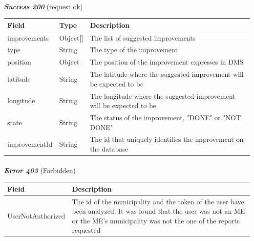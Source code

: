 						\paragraph{}
							\textit{\textbf{Success 200}} (request ok)
							\vspace{-2mm}
							\begin{table}[!h]
								\begin{tabular}{L{0.22\textwidth}L{0.15\textwidth}L{0.45\textwidth}}
									\toprule
									\textbf{Field} & \textbf{Type} & \textbf{Description} \\
									\midrule
									improvements & Object[] & The list of suggested improvements \\
									\hspace{2.5mm}type & String & The type of the improvement\\
									\hspace{2.5mm}position & Object & The position of the improvement expresses in DMS \\
									\hspace{5mm}latitude & String & The latitude where the suggested improvement will be expected to be \\
									\hspace{5mm}longitude & String & The longitude where the suggested improvement will be expected to be  \\
									\hspace{2.5mm}state & String & The status of the improvement, "DONE" or "NOT DONE" \\
									\hspace{2.5mm}improvementId & String & The id that uniquely identifies the improvement on the database \\
								 	\bottomrule
								\end{tabular}
							\end{table}
						\vspace{-5mm}
						\paragraph{}
							\textit{\textbf{Error 403}} (Forbidden)
							\vspace{-2mm}
							\begin{table}[!h]
								\begin{tabular}{L{0.4\textwidth}L{0.4\textwidth}}
									\toprule
									\textbf{Field} & \textbf{Description} \\
									\midrule
								  	UserNotAuthorized & The id of the municipality and the token of the user have been analyzed. It was found that the user was not an ME or the ME's  municipality was not the one of the reports requested  \\
								 	\bottomrule
								\end{tabular}
							\end{table}
						\vspace{-5mm}

